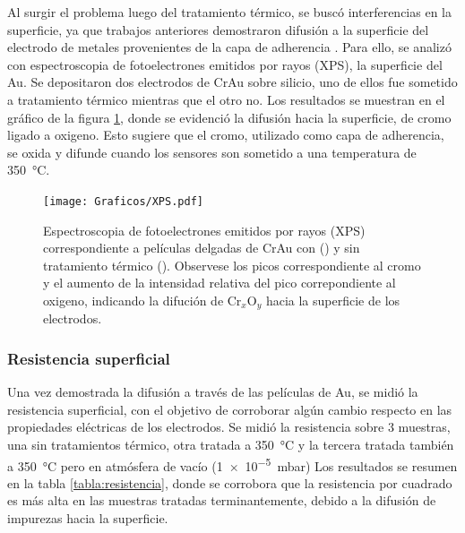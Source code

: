 {			Al surgir el problema luego del tratamiento térmico, se buscó interferencias en la superficie, ya que trabajos anteriores demostraron difusión a la superficie del electrodo de metales provenientes de la capa de adherencia \cite{Alonso1990,Moody2003}. Para ello, se analizó con espectroscopia de fotoelectrones emitidos por rayos (XPS), la superficie del Au. Se depositaron dos electrodos de Cr\textbar Au sobre silicio, uno de ellos fue sometido a tratamiento térmico mientras que el otro no. Los resultados se muestran en el gráfico de la figura \ref{fig:XPS}, donde se evidenció la difusión hacia la superficie, de cromo ligado a oxigeno. Esto sugiere que el cromo, utilizado como capa de adherencia, se oxida y difunde cuando los sensores son sometido a una temperatura de \SI{350}{\celsius}.

				\begin{figure}[ht!]
		 	       	\texttt{[image: Graficos/XPS.pdf]}
		        	\caption[XPS de peliculas delgadas de Cr\textbar Au]{Espectroscopia de fotoelectrones emitidos por rayos (XPS) correspondiente a películas delgadas de Cr\textbar Au con (\usebox{\rojo}) y sin tratamiento térmico  (\usebox{\marron}). Observese los picos correspondiente al cromo y el aumento de la intensidad relativa del pico correpondiente al oxigeno, indicando la difución de Cr$_x$O$_y$ hacia la superficie de los electrodos.}
		         	\label{fig:XPS}
		     		\end{figure}
		
		\subsubsection{Resistencia superficial}

			Una vez demostrada la difusión a través de las películas de Au, se midió la resistencia superficial, con el objetivo de corroborar algún cambio respecto en las propiedades eléctricas de los electrodos. Se midió la resistencia sobre 3 muestras, una sin tratamientos térmico, otra tratada a \SI{350}{\celsius} y la tercera tratada también a \SI{350}{\celsius} pero en atmósfera de vacío (\SI{1e-5}{\milli\bar}) Los resultados se resumen en la tabla \ref{tabla:resistencia}, donde se corrobora que la resistencia por cuadrado es más alta en las muestras tratadas terminantemente, debido a la difusión de impurezas hacia la superficie. 

}
